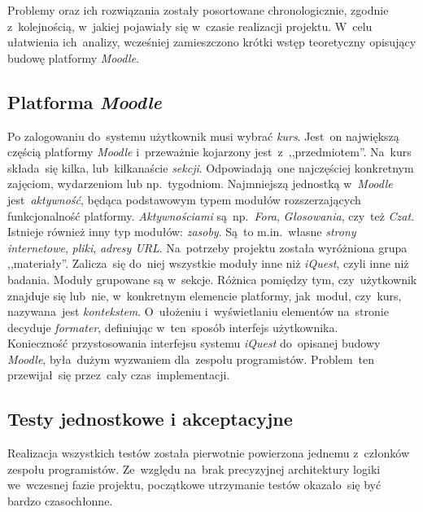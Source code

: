 Problemy oraz ich rozwiązania zostały posortowane chronologicznie, zgodnie z~kolejnością, w~jakiej pojawiały się w~czasie realizacji projektu. W~celu ułatwienia ich~analizy, wcześniej zamieszczono krótki wstęp teoretyczny opisujący budowę platformy \textit{Moodle}.

\subsection{Platforma \textit{Moodle}}
\label{Chapter622}

Po zalogowaniu do~systemu użytkownik musi wybrać \textit{kurs}. Jest~on największą częścią platformy \textit{Moodle} i~przeważnie kojarzony jest~z~,,przedmiotem''. Na~kurs składa~się kilka, lub~kilkanaście \textit{sekcji}. Odpowiadają~one najczęściej konkretnym zajęciom, wydarzeniom lub np.~tygodniom. Najmniejszą jednostką w~\textit{Moodle} jest~\textit{aktywność}, będąca podstawowym typem modułów rozszerzających funkcjonalność platformy. \textit{Aktywnościami} są~np.~\textit{Fora}, \textit{Głosowania}, czy~też \textit{Czat}. \\

Istnieje również inny typ modułów: \textit{zasoby}. Są~to m.in.~własne \textit{strony internetowe}, \textit{pliki}, \textit{adresy URL}. Na~potrzeby projektu została wyróżniona grupa ,,materiały''. Zalicza~się do~niej wszystkie moduły inne niż \textit{iQuest}, czyli inne niż badania. Moduły grupowane są w~sekcje. Różnica pomiędzy tym, czy~użytkownik znajduje się lub~nie, w~konkretnym elemencie platformy, jak~moduł, czy~kurs, nazywana~jest \textit{kontekstem}. O~ułożeniu i~wyświetlaniu elementów na~stronie decyduje \textit{formater}, definiując w~ten~sposób interfejs użytkownika. \\

Konieczność przystosowania interfejsu systemu \textit{iQuest} do~opisanej budowy \textit{Moodle}, była~dużym wyzwaniem dla~zespołu programistów. Problem~ten przewijał~się przez~cały czas~implementacji.




\subsection{Testy jednostkowe i akceptacyjne}
\label{Chapter62b}

Realizacja wszystkich testów została pierwotnie powierzona jednemu z~członków zespołu programistów. Ze~względu na~brak precyzyjnej architektury logiki we~wczesnej fazie projektu, początkowe utrzymanie testów okazało~się być bardzo czasochłonne. \\

